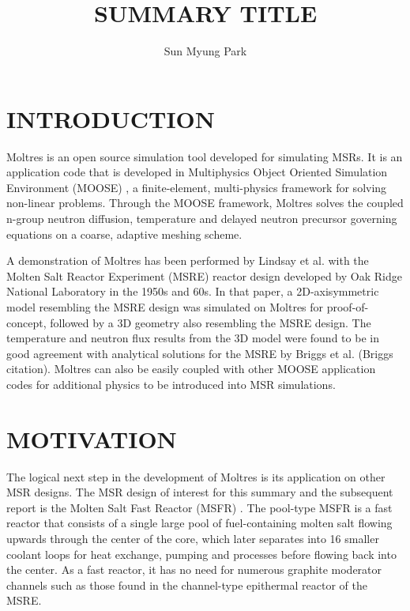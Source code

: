 \documentclass[letterpaper]{mandc2019}
\begin{document}
\title{SUMMARY TITLE}
\author{Sun Myung Park}

\maketitle
\justify


\section{INTRODUCTION}

Moltres is an open source simulation tool developed for simulating MSRs. It is an application code that is developed in Multiphysics Object Oriented Simulation Environment (MOOSE) \cite{gaston_moose:_2009}, a finite-element, multi-physics framework for solving non-linear problems. Through the MOOSE framework, Moltres solves the coupled n-group neutron diffusion, temperature and delayed neutron precursor governing equations on a coarse, adaptive meshing scheme. 

A demonstration of Moltres has been performed by Lindsay et al. \cite{lindsay_introduction_2018} with the Molten Salt Reactor Experiment (MSRE) reactor design developed by Oak Ridge National Laboratory in the 1950s and 60s. In that paper, a 2D-axisymmetric model resembling the MSRE design was simulated on Moltres for proof-of-concept, followed by a 3D geometry also resembling the MSRE design. The temperature and neutron flux results from the 3D model were found to be in good agreement with analytical solutions for the MSRE by Briggs et al. (Briggs citation). Moltres can also be easily coupled with other MOOSE application codes for additional physics to be introduced into MSR simulations.

\section{MOTIVATION}

The logical next step in the development of Moltres is its application on other MSR designs. The MSR design of interest for this summary and the subsequent report is the Molten Salt Fast Reactor (MSFR) \cite{serp_molten_2014}. The pool-type MSFR is a fast reactor that consists of a single large pool of fuel-containing molten salt flowing upwards through the center of the core, which later separates into 16 smaller coolant loops for heat exchange, pumping and processes before flowing back into the center. As a fast reactor, it has no need for numerous graphite moderator channels such as those found in the channel-type epithermal reactor of the MSRE.
\end{document}
